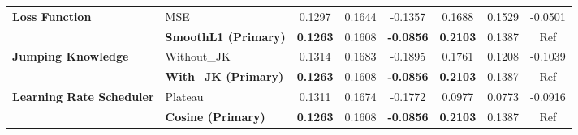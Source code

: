 \begin{table}[t]
\begin{tabular}{llcccccc}
\midrule
  \multirow{1}{*}{\textbf{Loss Function}} & MSE & 0.1297 & 0.1644 & -0.1357 & 0.1688 & 0.1529 & -0.0501 \\
   & \textbf{SmoothL1 (Primary)} & \textbf{0.1263} & 0.1608 & \textbf{-0.0856} & \textbf{0.2103} & 0.1387 & Ref \\
\midrule
  \multirow{1}{*}{\textbf{Jumping Knowledge}} & Without_JK & 0.1314 & 0.1683 & -0.1895 & 0.1761 & 0.1208 & -0.1039 \\
   & \textbf{With_JK (Primary)} & \textbf{0.1263} & 0.1608 & \textbf{-0.0856} & \textbf{0.2103} & 0.1387 & Ref \\
\midrule
  \multirow{1}{*}{\textbf{Learning Rate Scheduler}} & Plateau & 0.1311 & 0.1674 & -0.1772 & 0.0977 & 0.0773 & -0.0916 \\
   & \textbf{Cosine (Primary)} & \textbf{0.1263} & 0.1608 & \textbf{-0.0856} & \textbf{0.2103} & 0.1387 & Ref \\
\bottomrule
\end{tabular}
\end{table}